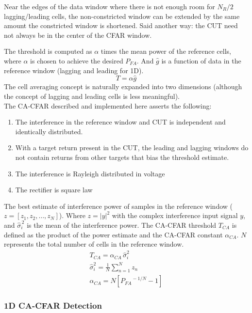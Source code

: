 \documentclass{article}
\begin{document}
Near the edges of the data window where there is not enough room for $N_R/2$
lagging/leading cells, the non-constricted window can be extended by the same
amount the constricted window is shortened. Said another way: the CUT need not
always be in the center of the CFAR window.

The threshold is computed as $\alpha$ times the mean power of the reference
cells, where $\alpha$ is chosen to achieve the desired $P_{F\!A}$. And $\hat{g}$
is a function of data in the reference window (lagging and leading for 1D).
\begin{equation*}
    T = \alpha \hat{g}
\end{equation*}
The cell averaging concept is naturally expanded into two dimensions (although
the concept of lagging and leading cells is less meaningful). \\

\noindent The CA-CFAR described and implemented here asserts the following:
\begin{enumerate}
    \item The interference in the reference window and CUT is independent and
        identically distributed.
    \item With a target return present in the CUT, the leading and lagging
        windows do not contain returns from other targets that bias the
        threshold estimate.
    \item The interference is Rayleigh distributed in voltage
    \item The rectifier is square law
\end{enumerate}

\noindent The best estimate of interference power of samples in the reference
window ($z = [z_1, z_2, \dots, z_N]$). Where $z = |y|^2$ with the complex
interference input signal $y$, and $\hat{\sigma}_i^{\,2}$ is the mean of the
interference power. The CA-CFAR threshold $T_{CA}$ is defined as the product of
the power estimate and the CA-CFAR constant $\alpha_{C\!A}$. $N$ represents the
total number of cells in the reference window.
\begin{gather*}
    T_{CA} = \alpha_{C\!A} \, \hat{\sigma}_i^2 \\
    \hat{\sigma}_i^2 = \frac{1}{N}\sum_{n=1}^N z_n \\
    \alpha_{CA} = N \left[{P_{F\!A}}^{\!\!-1/N} - 1\right]
\end{gather*}

\newpage

\subsubsection{1D CA-CFAR Detection}
\end{document}

